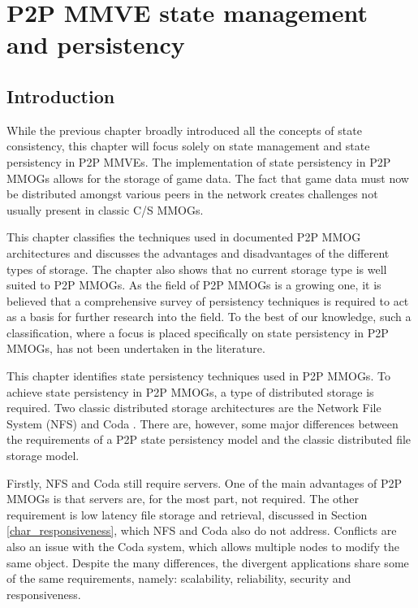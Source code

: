 \chapter{P2P MMVE state management and persistency}
\label{p2p_mmog_state_persistency}

\section{Introduction}

While the previous chapter broadly introduced all the concepts of state consistency, this chapter will focus solely on state management and state persistency in P2P MMVEs. The implementation of state persistency in P2P MMOGs allows for the storage of game data. The fact that game data must now be distributed amongst various peers in the network creates challenges not usually present in classic C/S MMOGs.

This chapter classifies the techniques used in documented P2P MMOG architectures and discusses the advantages and disadvantages of the different types of storage. The chapter also shows that no current storage type is well suited to P2P MMOGs. As the field of P2P MMOGs is a growing one, it is believed that a comprehensive survey of persistency techniques is required to act as a basis for further research into the field. To the best of our knowledge, such a classification, where a focus is placed specifically on state persistency in P2P MMOGs, has not been undertaken in the literature.

This chapter identifies state persistency techniques used in P2P MMOGs. To achieve state persistency in P2P MMOGs, a type of distributed storage is required. Two classic distributed storage architectures are the Network File System (NFS) \cite{NFS4_protocol} and Coda \cite{Kistler_Coda_disconnected}. There are, however, some major differences between the requirements of a P2P state persistency model and the classic distributed file storage model.

Firstly, NFS and Coda still require servers. One of the main advantages of P2P MMOGs is that servers are, for the most part, not required. The other requirement is low latency file storage and retrieval, discussed in Section \ref{char_responsiveness}, which NFS and Coda also do not address. Conflicts are also an issue with the Coda system, which allows multiple nodes to modify the same object. Despite the many differences, the divergent applications share some of the same requirements, namely: scalability, reliability, security and responsiveness.

